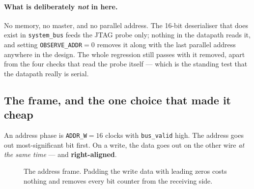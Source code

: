 \documentclass[11pt,a4paper]{article}
\newcommand{\sig}[1]{\texttt{#1}}
\begin{document}
\paragraph{What is deliberately \emph{not} in here.}
No memory, no master, and no parallel address. The 16-bit deserialiser that
does exist in \sig{system\_bus} feeds the JTAG probe only; nothing in the
datapath reads it, and setting \sig{OBSERVE\_ADDR}${=}0$ removes it along
with the last parallel address anywhere in the design. The whole regression
still passes with it removed, apart from the four checks that read the probe
itself --- which is the standing test that the datapath really is serial.

\subsection{The frame, and the one choice that made it cheap}
\label{sec:frame}

An address phase is \sig{ADDR\_W}${=}16$ clocks with \sig{bus\_valid} high.
The address goes out most-significant bit first. On a write, the data goes
out on the other wire \emph{at the same time} --- and \textbf{right-aligned}.

\begin{figure}[htb]
\centering
{}
\caption{The address frame. Padding the write data with leading zeros costs
nothing and removes every bit counter from the receiving side.}
\label{fig:frame}
\end{figure}
\end{document}
